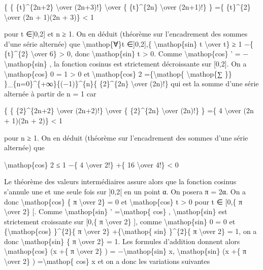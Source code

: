 \documentclass[]{article}
\begin{document}
\{ \{ \{t\}\^{}\{2n+2\} \textbackslash{}over (2n+3)!\}
\textbackslash{}over \{ \{t\}\^{}\{2n\} \textbackslash{}over (2n+1)!\}
\} =\{ \{t\}\^{}\{2\} \textbackslash{}over (2n + 1)(2n + 3)\}
\textless{} 1

pour t ∈{]}0,2{]} et n ≥ 1. On en déduit (théorème sur l'encadrement des
sommes d'une série alternée) que \textbackslash{}mathop\{∀\}t
∈{]}0,2{]},\{ \textbackslash{}mathop\{sin\} t \textbackslash{}over t\} ≥
1 −\{ \{t\}\^{}\{2\} \textbackslash{}over 6\} \textgreater{} 0, donc
\textbackslash{}mathop\{sin\} t \textgreater{} 0. Comme
\textbackslash{}mathop\{cos\} ' = −\textbackslash{}mathop\{sin\} , la
fonction cosinus est strictement décroissante sur {[}0,2{]}. On a
\textbackslash{}mathop\{cos\} 0 = 1 \textgreater{} 0 et
\textbackslash{}mathop\{cos\} 2 =\{\textbackslash{}mathop\{
\textbackslash{}mathop\{∑ \}\} \}\_\{n=0\}\^{}\{+∞\}\{(−1)\}\^{}\{n\}\{
\{2\}\^{}\{2n\} \textbackslash{}over (2n)!\} qui est la somme d'une
série alternée à partir de n = 1 car

\{ \{ \{2\}\^{}\{2n+2\} \textbackslash{}over (2n+2)!\}
\textbackslash{}over \{ \{2\}\^{}\{2n\} \textbackslash{}over (2n)!\} \}
=\{ 4 \textbackslash{}over (2n + 1)(2n + 2)\} \textless{} 1

pour n ≥ 1. On en déduit (théorème sur l'encadrement des sommes d'une
série alternée) que

\textbackslash{}mathop\{cos\} 2 ≤ 1 −\{ 4 \textbackslash{}over 2!\} +\{
16 \textbackslash{}over 4!\} \textless{} 0

Le théorème des valeurs intermédiaires assure alors que la fonction
cosinus s'annule une et une seule fois sur {]}0,2{[} en un point α. On
posera π = 2α. On a donc \textbackslash{}mathop\{cos\} \{ π
\textbackslash{}over 2\} = 0 et \textbackslash{}mathop\{cos\} t
\textgreater{} 0 pour t ∈ {[}0,\{ π \textbackslash{}over 2\} {[}. Comme
\textbackslash{}mathop\{sin\} ' =\textbackslash{}mathop\{ cos\} ,
\textbackslash{}mathop\{sin\} est strictement croissante sur {[}0,\{ π
\textbackslash{}over 2\} {]}, comme \textbackslash{}mathop\{sin\} 0 = 0
et \{\textbackslash{}mathop\{cos\} \}\^{}\{2\}\{ π \textbackslash{}over
2\} +\{\textbackslash{}mathop\{ sin\} \}\^{}\{2\}\{ π
\textbackslash{}over 2\} = 1, on a donc \textbackslash{}mathop\{sin\} \{
π \textbackslash{}over 2\} = 1. Les formules d'addition donnent alors
\textbackslash{}mathop\{cos\} (x +\{ π \textbackslash{}over 2\} ) =
−\textbackslash{}mathop\{sin\} x, \textbackslash{}mathop\{sin\} (x +\{ π
\textbackslash{}over 2\} ) =\textbackslash{}mathop\{ cos\} x et on a
donc les variations suivantes
\end{document}
